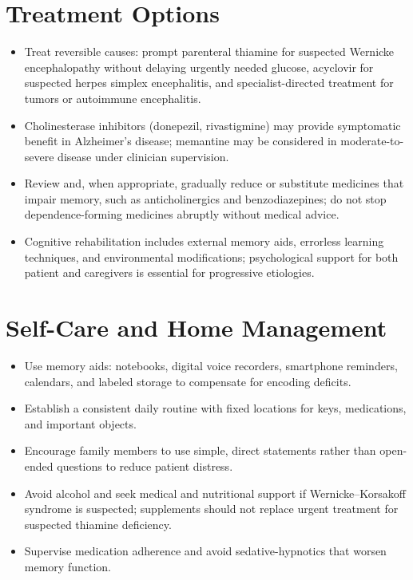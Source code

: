 \section*{Treatment Options}
\begin{itemize}
 \item Treat reversible causes: prompt parenteral thiamine for suspected Wernicke encephalopathy without delaying urgently needed glucose, acyclovir for suspected herpes simplex encephalitis, and specialist-directed treatment for tumors or autoimmune encephalitis.
 \item Cholinesterase inhibitors (donepezil, rivastigmine) may provide symptomatic benefit in Alzheimer's disease; memantine may be considered in moderate-to-severe disease under clinician supervision.
 \item Review and, when appropriate, gradually reduce or substitute medicines that impair memory, such as anticholinergics and benzodiazepines; do not stop dependence-forming medicines abruptly without medical advice.
 \item Cognitive rehabilitation includes external memory aids, errorless learning techniques, and environmental modifications; psychological support for both patient and caregivers is essential for progressive etiologies.
\end{itemize}

\section*{Self-Care and Home Management}
\begin{itemize}
 \item Use memory aids: notebooks, digital voice recorders, smartphone reminders, calendars, and labeled storage to compensate for encoding deficits.
 \item Establish a consistent daily routine with fixed locations for keys, medications, and important objects.
 \item Encourage family members to use simple, direct statements rather than open-ended questions to reduce patient distress.
 \item Avoid alcohol and seek medical and nutritional support if Wernicke--Korsakoff syndrome is suspected; supplements should not replace urgent treatment for suspected thiamine deficiency.
 \item Supervise medication adherence and avoid sedative-hypnotics that worsen memory function.
\end{itemize}

